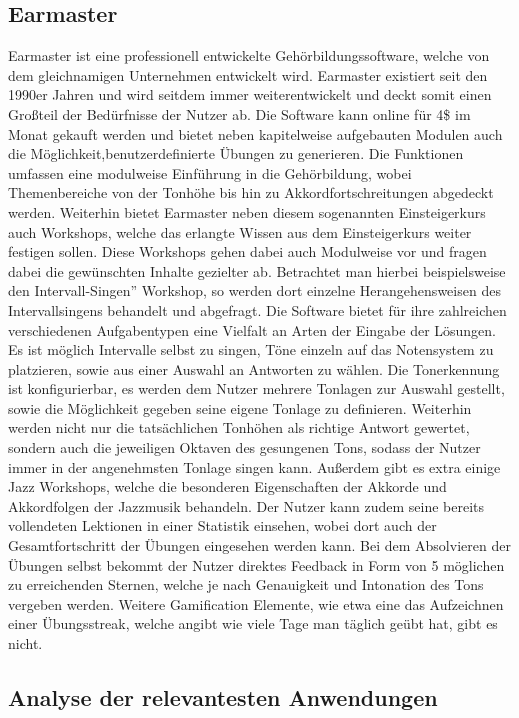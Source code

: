 \subsection*{Earmaster}
\label{sec:Earmaster}
Earmaster ist eine professionell entwickelte Gehörbildungssoftware, welche von dem gleichnamigen Unternehmen entwickelt wird. Earmaster existiert seit den 1990er Jahren und wird seitdem immer weiterentwickelt und deckt somit einen Großteil der Bedürfnisse der Nutzer ab. Die Software kann online für
4\$ im Monat gekauft werden und bietet neben kapitelweise aufgebauten Modulen auch die Möglichkeit,benutzerdefinierte Übungen zu generieren. Die Funktionen umfassen eine modulweise Einführung in die Gehörbildung, wobei Themenbereiche von der Tonhöhe bis hin zu Akkordfortschreitungen abgedeckt werden. Weiterhin bietet Earmaster neben diesem sogenannten Einsteigerkurs auch Workshops, welche das erlangte Wissen aus dem Einsteigerkurs weiter festigen sollen. Diese Workshops gehen dabei auch Modulweise vor und fragen dabei die gewünschten Inhalte gezielter ab. Betrachtet man hierbei beispielsweise den \glqq Intervall-Singen'' Workshop, so werden dort einzelne Herangehensweisen des Intervallsingens behandelt und abgefragt. Die Software bietet für ihre zahlreichen verschiedenen Aufgabentypen eine Vielfalt an Arten der Eingabe der Lösungen. Es ist möglich Intervalle selbst zu singen, Töne einzeln auf das Notensystem zu platzieren, sowie aus einer Auswahl an Antworten zu wählen. Die Tonerkennung ist konfigurierbar, es werden dem Nutzer mehrere Tonlagen zur Auswahl gestellt, sowie die Möglichkeit gegeben seine eigene Tonlage zu definieren. Weiterhin werden nicht nur die tatsächlichen Tonhöhen als richtige Antwort gewertet, sondern auch die jeweiligen Oktaven des gesungenen Tons, sodass der Nutzer immer in der angenehmsten Tonlage singen kann. Außerdem gibt es extra einige Jazz Workshops, welche die besonderen Eigenschaften der Akkorde und Akkordfolgen der Jazzmusik behandeln. Der Nutzer kann zudem seine bereits vollendeten Lektionen
in einer Statistik einsehen, wobei dort auch der Gesamtfortschritt der Übungen eingesehen werden kann. Bei dem Absolvieren der Übungen selbst bekommt der Nutzer direktes Feedback in Form von 5 möglichen zu erreichenden Sternen, welche je nach Genauigkeit und Intonation des Tons vergeben werden. Weitere Gamification Elemente, wie etwa eine das Aufzeichnen einer Übungsstreak, welche angibt wie viele Tage man täglich geübt hat, gibt es nicht. \cite{earmaster}

\subsection{Analyse der relevantesten Anwendungen}

